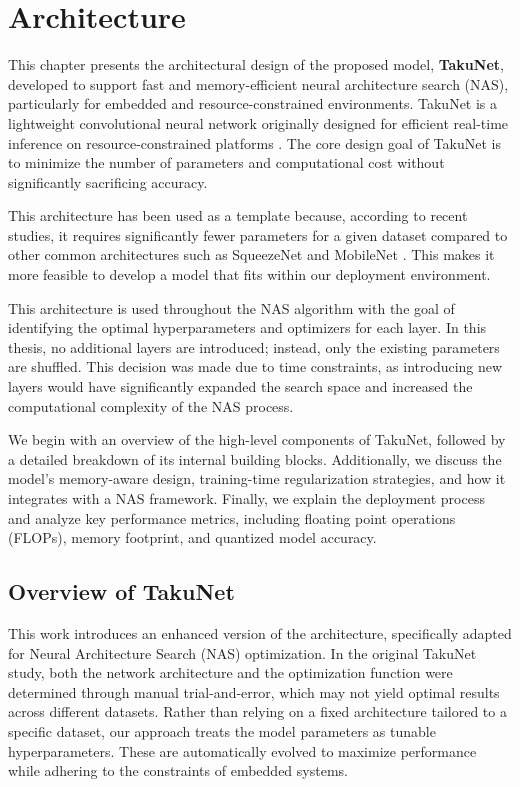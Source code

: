 \chapter{Architecture}
\label{chap:Architecture}

This chapter presents the architectural design of the proposed model, \textbf{TakuNet}, developed to support fast and memory-efficient neural architecture search (NAS), particularly for embedded and resource-constrained environments. 
TakuNet is a lightweight convolutional neural network originally designed for efficient real-time inference on resource-constrained platforms \cite{TakuNet}.
The core design goal of TakuNet is to minimize the number of parameters and computational cost without significantly sacrificing accuracy.

This architecture has been used as a template because, according to recent studies, it requires significantly fewer parameters for a given dataset compared to other common architectures such as SqueezeNet and MobileNet \cite{TakuNet}. This makes it more feasible to develop a model that fits within our deployment environment.

This architecture is used throughout the NAS algorithm with the goal of identifying the optimal hyperparameters and optimizers for each layer. In this thesis, no additional layers are introduced; instead, only the existing parameters are shuffled. This decision was made due to time constraints, as introducing new layers would have significantly expanded the search space and increased the computational complexity of the NAS process.

We begin with an overview of the high-level components of TakuNet, followed by a detailed breakdown of its internal building blocks. Additionally, we discuss the model’s memory-aware design, training-time regularization strategies, and how it integrates with a NAS framework. Finally, we explain the deployment process and analyze key performance metrics, including floating point operations (FLOPs), memory footprint, and quantized model accuracy.


\section{Overview of TakuNet}

This work introduces an enhanced version of the architecture, specifically adapted for Neural Architecture Search (NAS) optimization. In the original TakuNet study, both the network architecture and the optimization function were determined through manual trial-and-error, which may not yield optimal results across different datasets. Rather than relying on a fixed architecture tailored to a specific dataset, our approach treats the model parameters as tunable hyperparameters. These are automatically evolved to maximize performance while adhering to the constraints of embedded systems.

